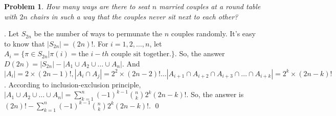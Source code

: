 \documentclass[12pt]{article}
\newtheorem{hw}{Problem}
\newenvironment{sol}
  {\par\vspace{3mm}\noindent{\it Solution}.}
  {\qed}
\begin{document}
\begin{hw}
How many ways are there to seat $n$ married couples at a round table with $2n$ chairs in such a way that the couples never sit next to each other?
\end{hw}

\begin{sol}
    Let $S_{2n}$ be the number of ways to permunate the $n$ couples randomly. It's easy to know that $|S_{2n}|=(2n)!$. For $i=1,2,\ldots, n$, let $A_i=\{\pi \in S_{2n}|\pi(i)=\text{the $i-th$ couple sit together.}\}$. So, the answer $D(2n)=|S_{2n}|-|A_1\cup A_2\cup \ldots \cup A_n|$.
    And $|A_i|=2\times (2n-1)!,|A_i\cap A_j|=2^2\times (2n-2)! \ldots |A_{i+1}\cap A_{i+2}\cap A_{i+3}\cap \ldots \cap A_{i+k}|=2^k\times (2n-k)! $. According to inclusion-exclusion principle, $|A_1\cup A_2\cup \ldots \cup A_n|=\sum_{k = 1}^{n} (-1)^{k-1}\binom{n}{k} 2^k (2n-k)! $.
    So, the answer is $(2n)!-\sum_{k = 1}^{n} (-1)^{k-1}\binom{n}{k} 2^k (2n-k)!$.
\end{sol}
\end{document}
